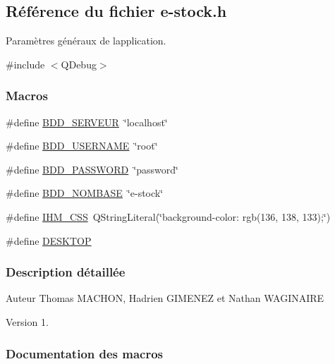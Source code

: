 \hypertarget{e-stock_8h}{}\subsection{Référence du fichier e-\/stock.h}
\label{e-stock_8h}


Paramètres généraux de l\textquotesingle{}application.  


{\ttfamily \#include $<$Q\+Debug$>$}\newline
\subsubsection*{Macros}
\begin{DoxyCompactItemize}
\item 
\#define \hyperlink{e-stock_8h_a423559dc987673b8aacaa9f369839bb0}{B\+D\+D\+\_\+\+S\+E\+R\+V\+E\+UR}~\char`\"{}localhost\char`\"{}
\item 
\#define \hyperlink{e-stock_8h_a88b5f5b81fa534553c68802384beff2c}{B\+D\+D\+\_\+\+U\+S\+E\+R\+N\+A\+ME}~\char`\"{}root\char`\"{}
\item 
\#define \hyperlink{e-stock_8h_ae2ded9166ed2553182545e97514c04f7}{B\+D\+D\+\_\+\+P\+A\+S\+S\+W\+O\+RD}~\char`\"{}password\char`\"{}
\item 
\#define \hyperlink{e-stock_8h_a45f8f15b8f9a7ab4c2b219038ff64f6b}{B\+D\+D\+\_\+\+N\+O\+M\+B\+A\+SE}~\char`\"{}e-\/stock\char`\"{}
\item 
\#define \hyperlink{e-stock_8h_a7185157bd11830373a0f95d0dc88b2c3}{I\+H\+M\+\_\+\+C\+SS}~Q\+String\+Literal(\char`\"{}background-\/color\+: rgb(136, 138, 133);\char`\"{})
\item 
\#define \hyperlink{e-stock_8h_a297b39d16b985a2a55c8c9e47ea5125e}{D\+E\+S\+K\+T\+OP}
\end{DoxyCompactItemize}


\subsubsection{Description détaillée}
\begin{DoxyAuthor}{Auteur}
Thomas M\+A\+C\+H\+ON, Hadrien G\+I\+M\+E\+N\+EZ et Nathan W\+A\+G\+I\+N\+A\+I\+RE
\end{DoxyAuthor}
\begin{DoxyVersion}{Version}
1. 
\end{DoxyVersion}


\subsubsection{Documentation des macros}
\mbox{\label{e-stock_8h_a45f8f15b8f9a7ab4c2b219038ff64f6b}} 
